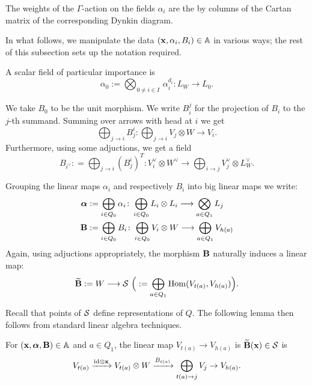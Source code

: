 \documentclass{amsart}
\newcommand{\balpha}{\boldsymbol{\alpha}}
\theoremstyle{definition}
\begin{document}
\begin{remark}\label{rm:cartan}
The weights of the $\Gamma$-action on the fields $\alpha_i$ are the by columns of the Cartan matrix of the corresponding Dynkin diagram.
\end{remark}

In what follows, we manipulate the data $(\mathbf{x}, \alpha_i, B_i) \in \mathbb{A}$ in various ways; the rest of this subsection sets up the notation required.

\begin{notation}
A scalar field of particular importance is $$\alpha_0:= \bigotimes_{0 \neq i \in I} \,\alpha_i^{d_i}: L_W \rightarrow L_0.$$
\end{notation}

\begin{notation}
We take $B_0$ to be the unit morphism.
We write $B_i^j$ for the projection of $B_i$ to the $j$-th summand. 
Summing over arrows with head at $i$ we get $$\bigoplus_{j \rightarrow i} B_j^i \colon \bigoplus_{j \rightarrow i} V_j \otimes W \longrightarrow V_i.$$
Furthermore, using some adjuctions, we get a field $$B_{i^\vee}: = \bigoplus_{j \rightarrow i} (B_j^i)^T \colon V_i^\vee \otimes W^\vee \longrightarrow \bigoplus_{i \rightarrow j} V_j^\vee \otimes L_W^\vee.$$
\end{notation}

\begin{notation}
Grouping the linear maps $\alpha_i$ and respectively $B_i$ into big linear maps we write: 
\begin{align*}
\balpha &:= \bigoplus_{i\in Q_0} \alpha_i \colon \bigoplus_{i\in Q_0} L_i \otimes L_i \longrightarrow \bigotimes_{a \in Q_1} L_j \\
\bfB &:= \bigoplus_{i\in Q_0} B_i \colon \bigoplus_{i\in Q_0} V_i \otimes W \longrightarrow \bigoplus_{a \in Q_1} V_{h(a)}
\end{align*}
Again, using adjuctions appropriately, the morphism $\mathbf{B}$ naturally induces a linear map:
$$\widetilde{\mathbf{B}} := W \longrightarrow \mathcal{S} \,\,\Big(:= \bigoplus_{a \in Q_1} \operatorname{Hom}(V_{t(a)}, V_{h(a)})\Big).$$
\end{notation}

Recall that points of $\mathcal{S}$ define representations of $Q$.
The following lemma then follows from standard linear algebra techniques.

\begin{lemma}\label{lem:Btilde}
For $(\bfx, \balpha, \bfB) \in \bA$ and $a \in Q_1$, the linear map $V_{t(a)} \rightarrow V_{h(a)}$ is $\widetilde{\mathbf{B}}(\mathbf{x}) \in \mathcal{S}$ is 
$$V_{t(a)} \xrightarrow{\textup{id} \otimes \mathbf{x}} V_{t(a)} \otimes W \xrightarrow{B_{t(a)}} \bigoplus_{t(a) \rightarrow j} V_j \rightarrow V_{h(a)}.$$
\end{lemma}
\end{document}

